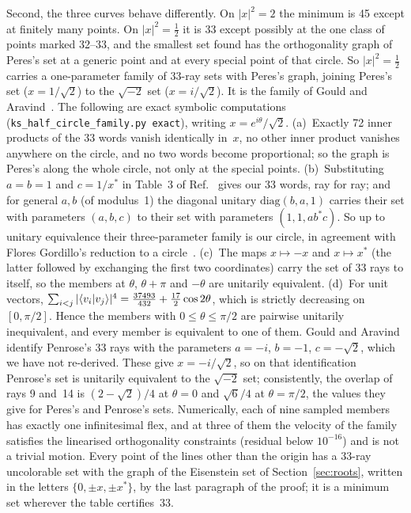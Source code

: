 Second, the three curves behave differently.  On $|x|^2=2$ the minimum is 45 except at
finitely many points.  On $|x|^2=\tfrac12$ it is 33 except possibly at the one class of
points marked 32--33, and the smallest set found has the orthogonality graph of Peres's set at
a generic point and at every special point of that circle.  So $|x|^2=\tfrac12$ carries a
one-parameter family of 33-ray sets with Peres's graph, joining Peres's set ($x=1/\sqrt2$) to
the $\sqrt{-2}$ set ($x=i/\sqrt2$).  It is the family of Gould and
Aravind~\cite{GouldAravind2010}.  The following are exact symbolic computations
(\texttt{ks\_half\_circle\_family.py exact}), writing $x=e^{i\theta}/\sqrt2$.
(a)~Exactly 72 inner products of the 33 words vanish identically in~$x$, no other inner product
vanishes anywhere on the circle, and no two words become proportional; so the graph is Peres's
along the whole circle, not only at the special points.
(b)~Substituting $a=b=1$ and $c=1/x^{*}$ in Table~3 of Ref.~\cite{GouldAravind2010} gives our 33
words, ray for ray; and for general $a,b$ (of modulus~1) the diagonal unitary
$\mathrm{diag}(b,a,1)$ carries their set with parameters $(a,b,c)$ to their set with parameters
$(1,1,ab^{*}c)$.  So up to unitary equivalence their three-parameter family is our circle,
in agreement with Flores Gordillo's reduction to a circle~\cite{FloresGordillo2026}.
(c)~The maps $x\mapsto-x$ and $x\mapsto x^{*}$ (the latter followed by exchanging the first two
coordinates) carry the set of 33 rays to itself, so the members at $\theta$, $\theta+\pi$ and
$-\theta$ are unitarily equivalent.  (d)~For unit vectors, $\sum_{i<j}|\langle v_i|v_j\rangle|^4=
\tfrac{37493}{432}+\tfrac{17}{2}\cos2\theta$, which is strictly decreasing on $[0,\pi/2]$.  Hence the
members with $0\le\theta\le\pi/2$ are pairwise unitarily inequivalent, and every member is
equivalent to one of them.  Gould and Aravind identify Penrose's 33 rays with the parameters
$a=-i$, $b=-1$, $c=-\sqrt2$, which we have not re-derived.  These give $x=-i/\sqrt2$, so on that
identification Penrose's set is unitarily equivalent to the $\sqrt{-2}$ set; consistently, the
overlap of rays 9 and~14 is $(2-\sqrt2)/4$ at $\theta=0$ and $\sqrt6/4$ at $\theta=\pi/2$, the
values they give for Peres's and Penrose's sets.  Numerically, each of nine sampled members has
exactly one infinitesimal flex, and at three of them the velocity of the family satisfies the
linearised orthogonality constraints (residual below $10^{-16}$) and is not a trivial motion.
Every point of the lines other than the origin has a
33-ray uncolorable set with the graph of the Eisenstein set of Section~\ref{sec:roots}, written
in the letters $\{0,\pm x,\pm x^{*}\}$, by the last paragraph of the proof; it is a minimum set
wherever the table certifies~33.

